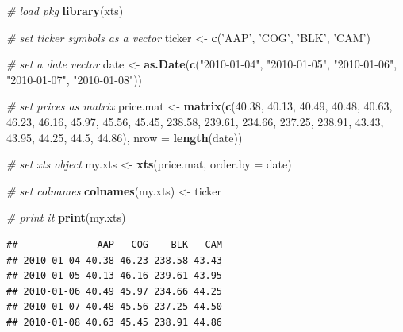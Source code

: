 \documentclass[11pt,]{book}
\newenvironment{Shaded}{\begin{snugshade}}{\end{snugshade}}
\newcommand{\KeywordTok}[1]{\textcolor[rgb]{0.27,0.27,0.27}{\textbf{#1}}}
\newcommand{\DataTypeTok}[1]{\textcolor[rgb]{0.27,0.27,0.27}{#1}}
\newcommand{\FloatTok}[1]{\textcolor[rgb]{0.06,0.06,0.06}{#1}}
\newcommand{\StringTok}[1]{\textcolor[rgb]{0.5,0.5,0.5}{#1}}
\newcommand{\CommentTok}[1]{\textcolor[rgb]{0.56,0.35,0.01}{\textit{#1}}}
\newcommand{\NormalTok}[1]{#1}
\begin{document}
\begin{Shaded}
\begin{Highlighting}[]
\CommentTok{# load pkg}
\KeywordTok{library}\NormalTok{(xts)}

\CommentTok{# set ticker symbols as a vector}
\NormalTok{ticker <-}\StringTok{ }\KeywordTok{c}\NormalTok{(}\StringTok{'AAP'}\NormalTok{, }\StringTok{'COG'}\NormalTok{, }\StringTok{'BLK'}\NormalTok{, }\StringTok{'CAM'}\NormalTok{)}

\CommentTok{# set a date vector}
\NormalTok{date <-}\StringTok{ }\KeywordTok{as.Date}\NormalTok{(}\KeywordTok{c}\NormalTok{(}\StringTok{"2010-01-04"}\NormalTok{, }\StringTok{"2010-01-05"}\NormalTok{, }\StringTok{"2010-01-06"}\NormalTok{, }
                  \StringTok{"2010-01-07"}\NormalTok{, }\StringTok{"2010-01-08"}\NormalTok{))}

\CommentTok{# set prices as  matrix                   }
\NormalTok{price.mat <-}\StringTok{ }\KeywordTok{matrix}\NormalTok{(}\KeywordTok{c}\NormalTok{(}\FloatTok{40.38}\NormalTok{,  }\FloatTok{40.13}\NormalTok{,  }\FloatTok{40.49}\NormalTok{,  }\FloatTok{40.48}\NormalTok{,  }\FloatTok{40.63}\NormalTok{,}
                      \FloatTok{46.23}\NormalTok{,  }\FloatTok{46.16}\NormalTok{,  }\FloatTok{45.97}\NormalTok{,  }\FloatTok{45.56}\NormalTok{,  }\FloatTok{45.45}\NormalTok{,}
                      \FloatTok{238.58}\NormalTok{, }\FloatTok{239.61}\NormalTok{, }\FloatTok{234.66}\NormalTok{, }\FloatTok{237.25}\NormalTok{, }\FloatTok{238.91}\NormalTok{,}
                      \FloatTok{43.43}\NormalTok{,  }\FloatTok{43.95}\NormalTok{,  }\FloatTok{44.25}\NormalTok{,  }\FloatTok{44.5}\NormalTok{,   }\FloatTok{44.86}\NormalTok{),}
                    \DataTypeTok{nrow =} \KeywordTok{length}\NormalTok{(date))}

\CommentTok{# set xts object}
\NormalTok{my.xts <-}\StringTok{ }\KeywordTok{xts}\NormalTok{(price.mat, }\DataTypeTok{order.by =}\NormalTok{ date)}

\CommentTok{# set colnames}
\KeywordTok{colnames}\NormalTok{(my.xts) <-}\StringTok{ }\NormalTok{ticker}

\CommentTok{# print it}
\KeywordTok{print}\NormalTok{(my.xts)}
\end{Highlighting}
\end{Shaded}

\begin{verbatim}
##              AAP   COG    BLK   CAM
## 2010-01-04 40.38 46.23 238.58 43.43
## 2010-01-05 40.13 46.16 239.61 43.95
## 2010-01-06 40.49 45.97 234.66 44.25
## 2010-01-07 40.48 45.56 237.25 44.50
## 2010-01-08 40.63 45.45 238.91 44.86
\end{verbatim}
\end{document}
